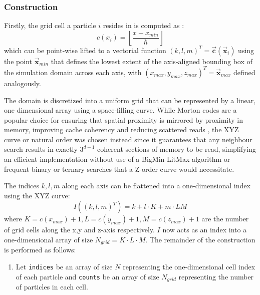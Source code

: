 \documentclass[oneside, a4paper]{book}
\newcommand\vek[1]{\vec{\bm{#1}}}
\newcommand\br[1]{\left(#1\right)}
\begin{document}
\begin{appendices}
    \subsubsection{Construction}
    Firstly,  the grid cell a particle $i$ resides in is computed as \autocite{compressed-neighbour-lists}:
    \begin{equation}
      c(x_i) =  \left\lfloor\frac{x-x_{min}}{\hbar}\right\rfloor
    \end{equation}
    which can be point-wise lifted to a vectorial function $(k,l,m)^T = \vek{c}\br{\vek{x}_i}$ using the point $\vek{x}_{min}$ that defines the lowest extent of the axis-aligned bounding box of the simulation domain across each axis, with $(x_{max}, y_{max}, z_{max})^T = \vek{x}_{max}$ defined analogously. 
    
    The domain is discretized into a uniform grid that can be represented by a linear, one dimensional array using a space-filling curve. While Morton codes are a popular choice \autocite{compressed-neighbour-lists} for ensuring that spatial proximity is mirrored by proximity in memory, improving cache coherency and reducing scattered reads \autocite{hoetzlein-rama-counting-sort}, the XYZ curve or natural order was chosen instead since it guarantees that any neighbour search results in exactly $3^{d-1}$ coherent sections of memory to be read, simplifying an efficient implementation without use of a BigMin-LitMax algorithm \autocite{bigminlitmax} or frequent binary or ternary searches that a Z-order curve would necessitate.
    
    The indices $k,l,m$ along each axis can be flattened into a one-dimensional index using the XYZ curve:
    \begin{equation}\label{eq:counting-sort-xyz}
      I\br{\br{k,l,m}^T} = k + l\cdot K + m\cdot LM
    \end{equation}
    where $K=c(x_{max})+1, L=c(y_{max})+1, M=c(z_{max})+1$ are the  number of grid cells along the x,y and z-axis respectively. $I$ now acts as an index into a one-dimensional array of size $N_{grid} = K\cdot L\cdot M$. The remainder of the construction is performed as follows:
    \begin{enumerate}
      \item Let \texttt{indices} be an array of size $N$ representing the one-dimensional cell index of each particle and \texttt{counts} be an array of size $N_{grid}$ representing the number of particles in each cell.


\end{enumerate}
\end{appendices}
\end{document}
